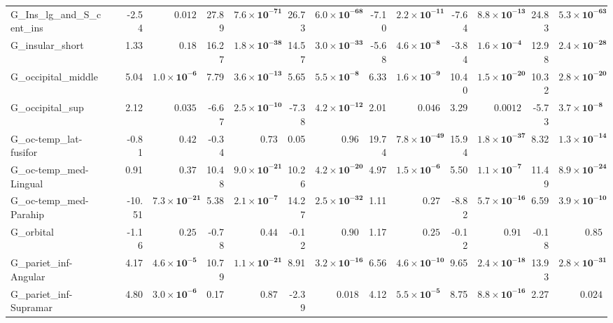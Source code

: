 {\begin{longtable}{llrrrrrrrrrrrr}
G\_Ins\_lg\_and\_S\_cent\_ins &  & -2.54 & $0.012$ & 27.89 & $\mathbf{7.6{\times}10^{-71}}$ & 26.73 & $\mathbf{6.0{\times}10^{-68}}$ & -7.10 & $\mathbf{2.2{\times}10^{-11}}$ & -7.64 & $\mathbf{8.8{\times}10^{-13}}$ & 24.83 & $\mathbf{5.3{\times}10^{-63}}$ \\
G\_insular\_short &  & 1.33 & $0.18$ & 16.27 & $\mathbf{1.8{\times}10^{-38}}$ & 14.57 & $\mathbf{3.0{\times}10^{-33}}$ & -5.68 & $\mathbf{4.6{\times}10^{-8}}$ & -3.84 & $\mathbf{1.6{\times}10^{-4}}$ & 12.98 & $\mathbf{2.4{\times}10^{-28}}$ \\
G\_occipital\_middle &  & 5.04 & $\mathbf{1.0{\times}10^{-6}}$ & 7.79 & $\mathbf{3.6{\times}10^{-13}}$ & 5.65 & $\mathbf{5.5{\times}10^{-8}}$ & 6.33 & $\mathbf{1.6{\times}10^{-9}}$ & 10.40 & $\mathbf{1.5{\times}10^{-20}}$ & 10.32 & $\mathbf{2.8{\times}10^{-20}}$ \\
G\_occipital\_sup &  & 2.12 & $0.035$ & -6.67 & $\mathbf{2.5{\times}10^{-10}}$ & -7.38 & $\mathbf{4.2{\times}10^{-12}}$ & 2.01 & $0.046$ & 3.29 & $0.0012$ & -5.73 & $\mathbf{3.7{\times}10^{-8}}$ \\
G\_oc-temp\_lat-fusifor &  & -0.81 & $0.42$ & -0.34 & $0.73$ & 0.05 & $0.96$ & 19.74 & $\mathbf{7.8{\times}10^{-49}}$ & 15.94 & $\mathbf{1.8{\times}10^{-37}}$ & 8.32 & $\mathbf{1.3{\times}10^{-14}}$ \\
G\_oc-temp\_med-Lingual &  & 0.91 & $0.37$ & 10.48 & $\mathbf{9.0{\times}10^{-21}}$ & 10.26 & $\mathbf{4.2{\times}10^{-20}}$ & 4.97 & $\mathbf{1.5{\times}10^{-6}}$ & 5.50 & $\mathbf{1.1{\times}10^{-7}}$ & 11.49 & $\mathbf{8.9{\times}10^{-24}}$ \\
G\_oc-temp\_med-Parahip &  & -10.51 & $\mathbf{7.3{\times}10^{-21}}$ & 5.38 & $\mathbf{2.1{\times}10^{-7}}$ & 14.27 & $\mathbf{2.5{\times}10^{-32}}$ & 1.11 & $0.27$ & -8.82 & $\mathbf{5.7{\times}10^{-16}}$ & 6.59 & $\mathbf{3.9{\times}10^{-10}}$ \\
G\_orbital &  & -1.16 & $0.25$ & -0.78 & $0.44$ & -0.12 & $0.90$ & 1.17 & $0.25$ & -0.12 & $0.91$ & -0.18 & $0.85$ \\
G\_pariet\_inf-Angular &  & 4.17 & $\mathbf{4.6{\times}10^{-5}}$ & 10.79 & $\mathbf{1.1{\times}10^{-21}}$ & 8.91 & $\mathbf{3.2{\times}10^{-16}}$ & 6.56 & $\mathbf{4.6{\times}10^{-10}}$ & 9.65 & $\mathbf{2.4{\times}10^{-18}}$ & 13.93 & $\mathbf{2.8{\times}10^{-31}}$ \\
G\_pariet\_inf-Supramar &  & 4.80 & $\mathbf{3.0{\times}10^{-6}}$ & 0.17 & $0.87$ & -2.39 & $0.018$ & 4.12 & $\mathbf{5.5{\times}10^{-5}}$ & 8.75 & $\mathbf{8.8{\times}10^{-16}}$ & 2.27 & $0.024$ \\

\end{longtable}}
